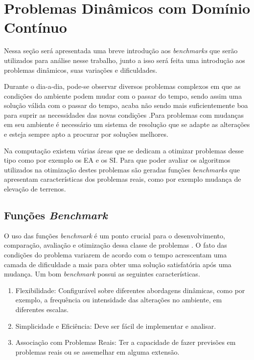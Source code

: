 \chapter{Problemas Dinâmicos com Domínio Contínuo}
\label{ch:problemas}
Nessa seção será apresentada uma breve introdução aos \textit{benchmarks} que serão utilizados para análise nesse trabalho, junto a isso será feita uma introdução aos problemas dinâmicos, suas variações e dificuldades.

Durante o dia-a-dia, pode-se observar diversos problemas complexos em que as condições do ambiente podem mudar com o passar do tempo, sendo assim uma solução válida com o passar do tempo, acaba não sendo mais suficientemente boa para suprir as necessidades das novas condições \cite{branke2012evolutionary}.Para problemas com mudanças em seu ambiente é necessário um sistema de resolução que se adapte as alterações e esteja sempre apto a procurar por soluções melhores.

Na computação existem várias áreas que se dedicam a otimizar problemas desse tipo como por exemplo os EA e os SI. Para que poder avaliar os algoritmos utilizados na otimização destes problemas são geradas funções \textit{benchmarks} que apresentam características dos problemas reais, como por exemplo mudança de elevação de terrenos.

\section{Funções \textit{Benchmark}}
\label{sec:revisao_benchmark}
O uso das funções \textit{benchmark} é um ponto crucial para o desenvolvimento, comparação, avaliação e otimização dessa classe de problemas \cite{evolution_dynamic}. O fato das condições do problema variarem de acordo com o tempo acrescentam uma camada de dificuldade a mais para obter uma solução satisfatória após uma mudança. Um bom \textit{benchmark} possui as seguintes características.

\begin{enumerate}  
\item Flexibilidade: Configurável sobre diferentes abordagens dinâmicas, como por exemplo, a frequência ou intensidade das alterações no ambiente, em diferentes escalas.

\item Simplicidade e Eficiência: Deve ser fácil de implementar e analisar.

\item Associação com Problemas Reais: Ter a capacidade de fazer previsões em problemas reais ou se assemelhar em alguma extensão.
\end{enumerate}

